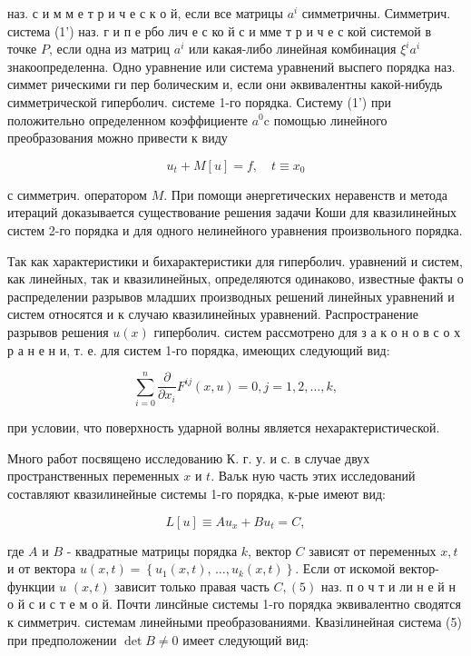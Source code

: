\documentclass[10pt]{article}
\begin{document}
наз. с и м м е т р и ч е с к о й, если все матрицы $a^{i}$ симметричны. Симметрич. система (1') наз. г и п е рбо лич е с ко й с и мме т р и ч е с кой системой в точке $P$, если одна из матриц $a^{i}$ или какая-либо линейная комбинация $\xi^{i} a^{i}$ знакоопределенна. Одно уравнение или система уравнений выспего порядка наз. симмет рическими ги пер болическим и, если они әквивалентны какой-нибудь симметрической гиперболич. системе 1-го порядка. Систему (1') при положительно определенном коэффициенте $a^{0} \mathrm{c}$ помощью линейного преобразования можно привести к виду



\[

u_{t}+M[u]=f, \quad t \equiv x_{0}

\]



с симметрич. оператором $M$. При помощи әнергетических неравенств и метода итераций доказывается существование решения задачи Коши для квазилинейных систем 2-го порядка и для одного нелинейного уравнения произвольного порядка.



Так как характеристики и бихарактеристики для гиперболич. уравнений и систем, как линейных, так и квазилинейных, определяются одинаково, известные факты о распределении разрывов младших производных решений линейных уравнений и систем относятся и к случаю квазилинейных уравнений. Распространение разрывов решения $u(x)$ гиперболич. систем рассмотрено для з а к о н о в с о х р а н е н и, т. е. для систем 1-го порядка, имеющих следующий вид:



\[

\sum_{i=0}^{n} \frac{\partial}{\partial x_{i}} F^{i j}(x, u)=0, j=1,2, \ldots, k,

\]



при условии, что поверхность ударной волны является нехарактеристической.



Много работ посвящено исследованию К. г. у. и с. в случае двух пространственных переменных $x$ и $t$. Ваљк ную часть этих исследований составляют квазилинейные системы 1-го порядка, к-рые имеют вид:



\[

L[u] \equiv A u_{x}+B u_{t}=C,

\]



где $A$ и $B$ - квадратные матрицы порядка $k$, вектор $C$ зависят от переменных $x, t$ и от вектора $u(x, t)=\left\{u_{1}(x, t)\right.$, $\left.\ldots, u_{k}(x, t)\right\}$. Если от искомой вектор-функции $u$ $(x, t)$ зависит только правая часть $C,(5)$ наз. п о ч т и ли н е й н о й с и с т е м о й. Почти линсйные системы 1-го порядка эквивалентно сводятся к симметрич. системам линейными преобразованиями. Квазілинейная система (5) при предположении $\operatorname{det} B \neq 0$ имеет следующий вид:
\end{document}
